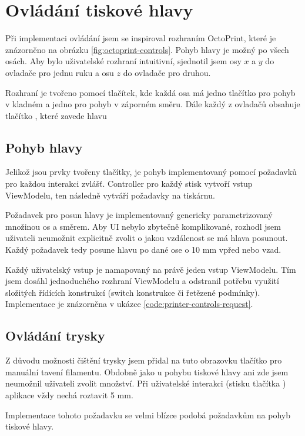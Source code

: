 \section{Ovládání tiskové hlavy}

Při implementaci ovládání jsem se inspiroval rozhraním OctoPrint, které je znázorněno na obrázku \ref{fig:octoprint-controls}.
Pohyb hlavy je možný po všech osách.
Aby bylo uživatelské rozhraní intuitivní, sjednotil jsem osy $x$ a $y$ do ovladače pro jednu ruku a osu $z$ do ovladače pro druhou.


Rozhraní je tvořeno pomocí tlačítek, kde každá osa má jedno tlačítko pro pohyb v kladném a jedno pro pohyb v záporném směru.
Dále každý z ovladačů obsahuje tlačítko , které zavede hlavu 

\subsection{Pohyb hlavy}

Jelikož jsou prvky tvořeny tlačítky, je pohyb implementovaný pomocí požadavků pro každou interakci zvlášť.
Controller pro každý stisk vytvoří vstup ViewModelu, ten následně vytváří požadavky na tiskárnu.

Požadavek pro posun hlavy je implementovaný genericky parametrizovaný množinou os a směrem.
Aby UI nebylo zbytečně komplikované, rozhodl jsem uživateli neumožnit explicitně zvolit o jakou vzdálenost se má hlava posunout.
Každý požadavek tedy posune hlavu po dané ose o 10 mm vpřed nebo vzad.

Každý uživatelský vstup je namapovaný na právě jeden vstup ViewModelu.
Tím jsem dosáhl jednoduchého rozhraní ViewModelu a odstranil potřebu využití složitých řídících konstrukcí (switch konstrukce či řetězené podmínky).
Implementace je znázorněna v ukázce \ref{code:printer-controls-request}.


\subsection{Ovládání trysky}

Z důvodu možnosti čištění trysky jsem přidal na tuto obrazovku tlačítko pro manuální tavení filamentu.
Obdobně jako u pohybu tiskové hlavy ani zde jsem neumožnil uživateli zvolit množství.
Při uživatelské interakci (stisku tlačítka ) aplikace vždy nechá roztavit 5 mm.

Implementace tohoto požadavku se velmi blízce podobá požadavkům na pohyb tiskové hlavy.
